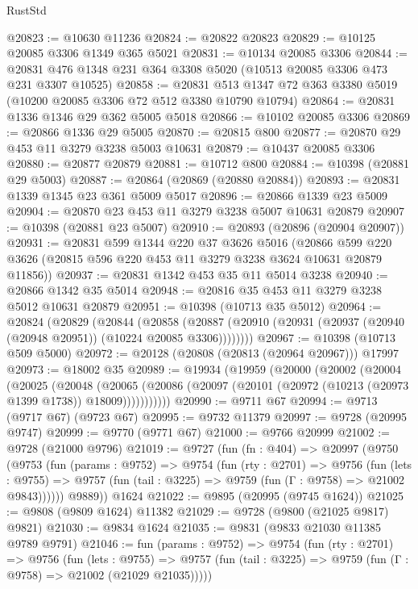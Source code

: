 \begin{lexlean}{RustStd}
\begin{coremodule}
@20823 := @10630 @11236
@20824 := @20822 @20823
@20829 := @10125 @20085 @3306 @1349 @365 @5021
@20831 := @10134 @20085 @3306
@20844 := @20831 @476 @1348 @231 @364 @3308 @5020 (@10513 @20085 @3306 @473 @231 @3307 @10525)
@20858 := @20831 @513 @1347 @72 @363 @3380 @5019 (@10200 @20085 @3306 @72 @512 @3380 @10790 @10794)
@20864 := @20831 @1336 @1346 @29 @362 @5005 @5018
@20866 := @10102 @20085 @3306
@20869 := @20866 @1336 @29 @5005
@20870 := @20815 @800
@20877 := @20870 @29 @453 @11 @3279 @3238 @5003 @10631
@20879 := @10437 @20085 @3306
@20880 := @20877 @20879
@20881 := @10712 @800
@20884 := @10398 (@20881 @29 @5003)
@20887 := @20864 (@20869 (@20880 @20884))
@20893 := @20831 @1339 @1345 @23 @361 @5009 @5017
@20896 := @20866 @1339 @23 @5009
@20904 := @20870 @23 @453 @11 @3279 @3238 @5007 @10631 @20879
@20907 := @10398 (@20881 @23 @5007)
@20910 := @20893 (@20896 (@20904 @20907))
@20931 := @20831
    @599
    @1344
    @220
    @37
    @3626
    @5016
    (@20866 @599 @220 @3626 (@20815 @596 @220 @453 @11 @3279 @3238 @3624 @10631 @20879 @11856))
@20937 := @20831 @1342 @453 @35 @11 @5014 @3238
@20940 := @20866 @1342 @35 @5014
@20948 := @20816 @35 @453 @11 @3279 @3238 @5012 @10631 @20879
@20951 := @10398 (@10713 @35 @5012)
@20964 := @20824
    (@20829
      (@20844
        (@20858
          (@20887 (@20910 (@20931 (@20937 (@20940 (@20948 @20951)) (@10224 @20085 @3306))))))))
@20967 := @10398 (@10713 @509 @5000)
@20972 := @20128 (@20808 (@20813 (@20964 @20967))) @17997
@20973 := @18002 @35
@20989 := @19934
    (@19959
      (@20000
        (@20002
          (@20004
            (@20025
              (@20048
                (@20065
                  (@20086 (@20097 (@20101 (@20972 (@10213 (@20973 @1399 @1738)) @18009)))))))))))
@20990 := @9711 @67
@20994 := @9713 (@9717 @67) (@9723 @67)
@20995 := @9732 @11379
@20997 := @9728 (@20995 @9747)
@20999 := @9770 (@9771 @67)
@21000 := @9766 @20999
@21002 := @9728 (@21000 @9796)
@21019 := @9727
    (fun (fn : @404) =>
    @20997
      (@9750
        (@9753
          (fun (params : @9752) =>
          @9754
            (fun (rty : @2701) =>
            @9756
              (fun (lets : @9755) =>
              @9757 (fun (tail : @3225) => @9759 (fun (Γ : @9758) => @21002 @9843))))))
        @9889))
    @1624
@21022 := @9895 (@20995 (@9745 @1624))
@21025 := @9808 (@9809 @1624) @11382
@21029 := @9728 (@9800 (@21025 @9817) @9821)
@21030 := @9834 @1624
@21035 := @9831 (@9833 @21030 @11385 @9789 @9791)
@21046 := fun (params : @9752) =>
  @9754
    (fun (rty : @2701) =>
    @9756
      (fun (lets : @9755) =>
      @9757 (fun (tail : @3225) => @9759 (fun (Γ : @9758) => @21002 (@21029 @21035)))))

\end{coremodule}
\end{lexlean}
